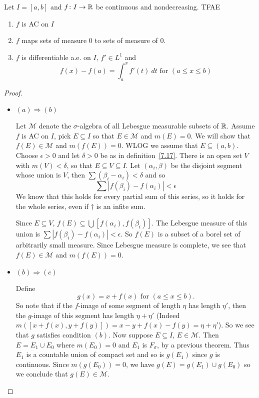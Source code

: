     \begin{theorem}\label{7.18}
            Let $I=[a,b]$ and $f\colon I\rightarrow \mathbb{R}$ be continuous and nondecreasing. TFAE\begin{enumerate}[label=(\alph*)]
                \item $f$ is AC on $I$
                \item $f$ maps sets of measure $0$ to sets of measure of $0$.
                \item $f$ is differentiable a.e. on $I$, $f'\in L^1$ and \[
                    f(x) - f(a) = \int_a^x f'(t)~dt \text{ for }(a\leq x\leq b)    
                \]
            \end{enumerate}

            \begin{proof}
                \begin{itemize}
                    \item $(a)\Rightarrow (b)$
                    
                    Let $\mathcal{M}$ denote the $\sigma$-algebra of all Lebesgue measurable subsets of $\mathbb{R}$. Assume $f$ is AC on $I$, pick $E\subseteq I$ so that $E\in \mathcal{M}$ and $m(E) = 0$. We will show that $f(E)\in \mathcal{M}$ and $m(f(E)) = 0$. WLOG we assume that $E\subseteq (a,b)$.
                    Choose $\epsilon>0 $ and let $\delta>0$ be as in definition~\ref{7.17}. There is an open set $V$ with $m(V)<\delta$, so that $E\subseteq V\subseteq I$. Let $(\alpha_i,\beta)$ be the disjoint segment whose union is $V$, then $\sum (\beta_i-\alpha_i)<\delta$ and so \[
                        \sum |f(\beta_i)-f(\alpha_i)|<\epsilon \tag{$dagger$}
                    \]
                    We know that this holds for every partial sum of this series, so it holds for the whole series, even if $\dagger$ is an infite sum.
                    
                    Since $E\subseteq V$, $f(E)\subseteq \bigcup [f(\alpha_i),f(\beta_i)]$. The Lebesgue measure of this union is $\sum |f(\beta_i)-f(\alpha_i)|<\epsilon$. So $f(E)$ is a subset of a borel set of arbitrarily small measure. Since Lebesgue measure is complete, we see that $f(E)\in \mathcal{M}$ and $m(f(E)) = 0$.
                    \item $(b)\Rightarrow (c)$
                    
                    Define \[
                        g(x) = x+f(x) \text{ for }(a\leq x\leq b).    
                    \]
                    So note that if the $f$-image of some segment of length $\eta$ has length $\eta'$, then the $g$-image of this segment has length $\eta+\eta'$ (Indeed $m([x+f(x),y+f(y)]) = x-y+f(x)-f(y) = \eta+\eta'$).  
                    So we see that $g$ satisfies condition $(b)$. Now suppose $E\subseteq I$, $E\in \mathcal{M}$. Then $E = E_1\cup E_0$ where $m(E_0) = 0$ and $E_1$ is $F_\sigma$, by a previous theorem. Thus $E_1$ is a countable union of compact set and so is $g(E_1)$ since $g$ is continuous. Since $m(g(E_0)) = 0$, we have $g(E) = g(E_1)\cup g(E_0)$ so we conclude that $g(E)\in \mathcal{M}$.


\end{itemize}
\end{proof}
\end{theorem}
